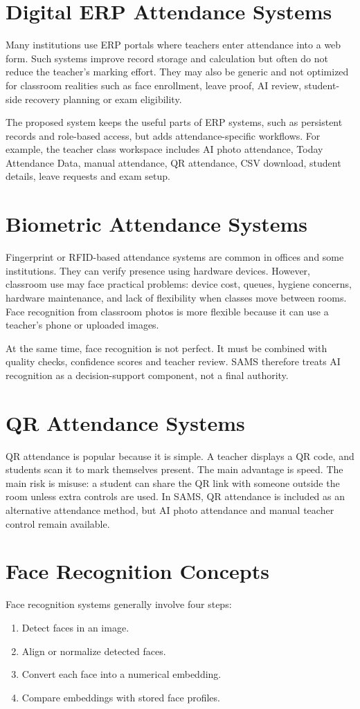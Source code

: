 \section{Digital ERP Attendance Systems}
Many institutions use ERP portals where teachers enter attendance into a web form. Such systems improve record storage and calculation but often do not reduce the teacher's marking effort. They may also be generic and not optimized for classroom realities such as face enrollment, leave proof, AI review, student-side recovery planning or exam eligibility.

The proposed system keeps the useful parts of ERP systems, such as persistent records and role-based access, but adds attendance-specific workflows. For example, the teacher class workspace includes AI photo attendance, Today Attendance Data, manual attendance, QR attendance, CSV download, student details, leave requests and exam setup.

\section{Biometric Attendance Systems}
Fingerprint or RFID-based attendance systems are common in offices and some institutions. They can verify presence using hardware devices. However, classroom use may face practical problems: device cost, queues, hygiene concerns, hardware maintenance, and lack of flexibility when classes move between rooms. Face recognition from classroom photos is more flexible because it can use a teacher's phone or uploaded images.

At the same time, face recognition is not perfect. It must be combined with quality checks, confidence scores and teacher review. SAMS therefore treats AI recognition as a decision-support component, not a final authority.

\section{QR Attendance Systems}
QR attendance is popular because it is simple. A teacher displays a QR code, and students scan it to mark themselves present. The main advantage is speed. The main risk is misuse: a student can share the QR link with someone outside the room unless extra controls are used. In SAMS, QR attendance is included as an alternative attendance method, but AI photo attendance and manual teacher control remain available.

\section{Face Recognition Concepts}
Face recognition systems generally involve four steps:
\begin{enumerate}[label=\arabic*.]
    \item Detect faces in an image.
    \item Align or normalize detected faces.
    \item Convert each face into a numerical embedding.
    \item Compare embeddings with stored face profiles.
\end{enumerate}

